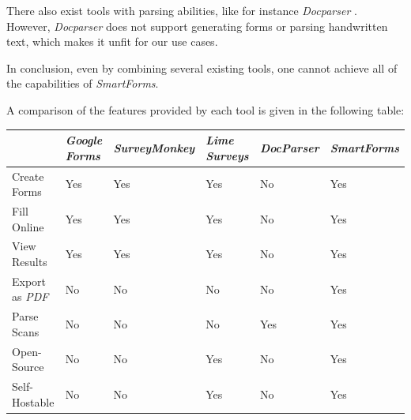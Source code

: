 \documentclass[11pt, a4paper]{report}
\begin{document}
There also exist tools with parsing abilities, like for instance \textit{Docparser} \cite{docparser}. However, \textit{Docparser} does not support generating forms or parsing handwritten text, which makes it unfit for our use cases. 

In conclusion, even by combining several existing tools, one cannot achieve all of the capabilities of \textit{SmartForms}.

A comparison of the features provided by each tool is given in the following table:

\begin{center}
	\begin{tabular}{ | l | l | l | l | l | l |}
		\hline
		& \textit{Google Forms} & \textit{SurveyMonkey} & \textit{Lime Surveys} & \textit{DocParser} & \textit{SmartForms} \\
		\hline
		Create Forms & \cellcolor[rgb]{0.5,1,0.5}Yes & \cellcolor[rgb]{0.5,1,0.5}Yes & \cellcolor[rgb]{0.5,1,0.5}Yes & \cellcolor[rgb]{1,0.5,0.5}No & \cellcolor[rgb]{0.5,1,0.5}Yes \\
		\hline
		Fill Online & \cellcolor[rgb]{0.5,1,0.5}Yes & \cellcolor[rgb]{0.5,1,0.5}Yes & \cellcolor[rgb]{0.5,1,0.5}Yes & \cellcolor[rgb]{1,0.5,0.5}No & \cellcolor[rgb]{0.5,1,0.5}Yes \\
		\hline
		View Results & \cellcolor[rgb]{0.5,1,0.5}Yes & \cellcolor[rgb]{0.5,1,0.5}Yes & \cellcolor[rgb]{0.5,1,0.5}Yes & \cellcolor[rgb]{1,0.5,0.5}No & \cellcolor[rgb]{0.5,1,0.5}Yes \\
		\hline
		Export as \textit{PDF} & \cellcolor[rgb]{1,0.5,0.5}No & \cellcolor[rgb]{1,0.5,0.5}No & \cellcolor[rgb]{1,0.5,0.5}No & \cellcolor[rgb]{1,0.5,0.5}No & \cellcolor[rgb]{0.5,1,0.5}Yes \\
		\hline
		Parse Scans & \cellcolor[rgb]{1,0.5,0.5}No & \cellcolor[rgb]{1,0.5,0.5}No & \cellcolor[rgb]{1,0.5,0.5}No & \cellcolor[rgb]{0.5,1,0.5}Yes & \cellcolor[rgb]{0.5,1,0.5}Yes \\
		\hline
		Open-Source & \cellcolor[rgb]{1,0.5,0.5}No & \cellcolor[rgb]{1,0.5,0.5}No & \cellcolor[rgb]{0.5,1,0.5}Yes & \cellcolor[rgb]{1,0.5,0.5}No & \cellcolor[rgb]{0.5,1,0.5}Yes \\
		\hline
		Self-Hostable & \cellcolor[rgb]{1,0.5,0.5}No & \cellcolor[rgb]{1,0.5,0.5}No & \cellcolor[rgb]{0.5,1,0.5}Yes & \cellcolor[rgb]{1,0.5,0.5}No & \cellcolor[rgb]{0.5,1,0.5}Yes \\
		\hline
	\end{tabular}
\end{center}
\end{document}
